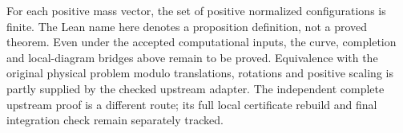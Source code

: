 \begin{theorem}
\label{bp:main-target}
\notready
For each positive mass vector, the set of positive normalized configurations
is finite. The Lean name here denotes a proposition definition, not a proved
theorem. Even under the accepted computational inputs, the curve, completion
and local-diagram bridges above remain to be proved. Equivalence with the
original physical problem modulo translations, rotations and positive scaling
is partly supplied by the checked upstream adapter. The independent complete
upstream proof is a different route; its full local certificate rebuild and
final integration check remain separately tracked.
\end{theorem}


